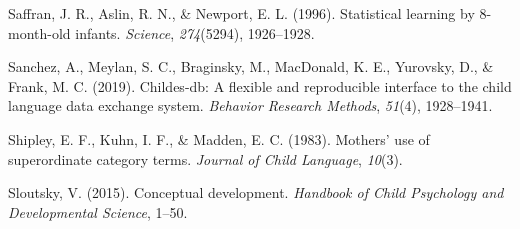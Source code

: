 \documentclass[10pt, letterpaper]{article}
\begin{document}
\leavevmode\hypertarget{ref-saffran1996}{}%
Saffran, J. R., Aslin, R. N., \& Newport, E. L. (1996). Statistical
learning by 8-month-old infants. \emph{Science}, \emph{274}(5294),
1926--1928.

\leavevmode\hypertarget{ref-sanchez2019}{}%
Sanchez, A., Meylan, S. C., Braginsky, M., MacDonald, K. E., Yurovsky,
D., \& Frank, M. C. (2019). Childes-db: A flexible and reproducible
interface to the child language data exchange system. \emph{Behavior
Research Methods}, \emph{51}(4), 1928--1941.

\leavevmode\hypertarget{ref-shipley1983}{}%
Shipley, E. F., Kuhn, I. F., \& Madden, E. C. (1983). Mothers' use of
superordinate category terms. \emph{Journal of Child Language},
\emph{10}(3).

\leavevmode\hypertarget{ref-sloutsky2015}{}%
Sloutsky, V. (2015). Conceptual development. \emph{Handbook of Child
Psychology and Developmental Science}, 1--50.


\end{document}

